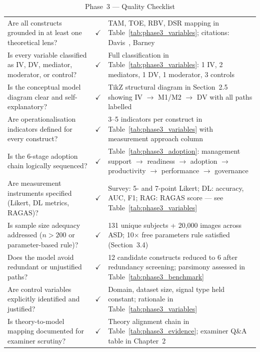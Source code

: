 \begin{xltabular}{\textwidth}{@{} p{0.35\textwidth} c p{0.45\textwidth} @{}}
\caption{Phase~3 --- Quality Checklist}
\label{tab:phase3_checklist}\\
\toprule
{} &  &  \\
\midrule
\endfirsthead
\endhead
\bottomrule
\endlastfoot
Are all constructs grounded in at least one theoretical lens?                & $\checkmark$ & TAM, TOE, RBV, DSR mapping in Table~\ref{tab:phase3_variables}; citations: Davis~\citep{davis1989tam}, Barney~\citep{barney1991firm} \\
\addlinespace
Is every variable classified as IV, DV, mediator, moderator, or control?    & $\checkmark$ & Full classification in Table~\ref{tab:phase3_variables}: 1 IV, 2 mediators, 1 DV, 1 moderator, 3 controls \\
\addlinespace
Is the conceptual model diagram clear and self-explanatory?                 & $\checkmark$ & TikZ structural diagram in Section~2.5 showing IV $\rightarrow$ M1/M2 $\rightarrow$ DV with all paths labelled \\
\addlinespace
Are operationalisation indicators defined for every construct?              & $\checkmark$ & 3--5 indicators per construct in Table~\ref{tab:phase3_variables} with measurement approach column \\
\addlinespace
Is the 6-stage adoption chain logically sequenced?                          & $\checkmark$ & Table~\ref{tab:phase3_adoption}: management support $\rightarrow$ readiness $\rightarrow$ adoption $\rightarrow$ productivity $\rightarrow$ performance $\rightarrow$ governance \\
\addlinespace
Are measurement instruments specified (Likert, DL metrics, RAGAS)?          & $\checkmark$ & Survey: 5- and 7-point Likert; DL: accuracy, AUC, F1; RAG: RAGAS score --- see Table~\ref{tab:phase3_variables} \\
\addlinespace
Is sample size adequacy addressed ($n > 200$ or parameter-based rule)?      & $\checkmark$ & 131 unique subjects + 20{,}000 images across ASD; 10$\times$ free parameters rule satisfied (Section~3.4) \\
\addlinespace
Does the model avoid redundant or unjustified paths?                        & $\checkmark$ & 12 candidate constructs reduced to 6 after redundancy screening; parsimony assessed in Table~\ref{tab:phase3_benchmark} \\
\addlinespace
Are control variables explicitly identified and justified?                  & $\checkmark$ & Domain, dataset size, signal type held constant; rationale in Table~\ref{tab:phase3_variables} \\
\addlinespace
Is theory-to-model mapping documented for examiner scrutiny?                & $\checkmark$ & Theory alignment chain in Table~\ref{tab:phase3_evidence}; examiner Q\&A table in Chapter~2 \\
\end{xltabular}
\endgroup

